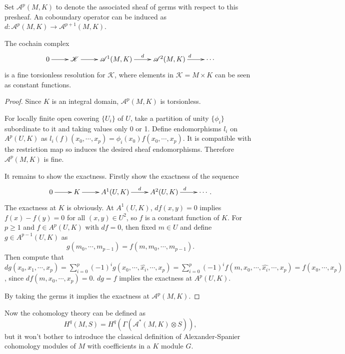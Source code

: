 \documentclass[twoside]{article}
\begin{document}
Set $\mathscr {A}^p(M,K)$ to denote the associated sheaf of germs with respect to this presheaf. An coboundary operator  can be induced as $d\colon \mathscr {A}^p(M,K)\to \mathscr {A}^{p+1}(M,K)$.

 \begin{lemma}\label{fine}

The  cochain complex
\begin{equation*}\xymatrix{
 0\ar[r]& \mathscr {K}\ar[r]& \mathscr {A}^1(M,K)\ar[r]^d &\mathscr {A}^2(M,K)\ar[r]^d&\cdots
 }
\end{equation*}
is a fine torsionless resolution for $\mathscr{K}$,
where  elements in $\mathscr {K}=M\times K$ can be seen as constant functions.
 \end{lemma}


 \begin{proof}
  Since $K$ is an integral domain, $\mathscr {A}^p(M,K)$ is torsionless.

  For locally finite open covering $\{U_i\}$ of $U$,  take a partition of unity $\{\phi_i\}$ subordinate to it and taking values only 0 or 1. Define  endomorphisms $l_i$ on $A^p(U,K)$ as $l_i(f)(x_0,\cdots,x_{p})=\phi_i(x_0)f(x_0,\cdots,x_{p})$. It is compatible with the restriction map so induces the desired sheaf endomorphisms. Therefore $\mathscr {A}^p(M,K)$ is fine.

  It remains to show the exactness. Firstly show the exactness of the sequence \begin{equation*}\xymatrix{
 0\ar[r]& K\ar[r]& A^1(U,K)\ar[r]^d &A^2(U,K)\ar[r]^d&\cdots.
 }
\end{equation*}
The exactness at $K$  is obviously. At $A^1(U,K)$, $df(x,y)=0$ implies $f(x)-f(y)=0$ for all $(x,y)\in U^2$, so $f$ is a constant function of $K$. For $p\geq 1$ and $f\in A^p(U,K)$ with $df=0$, then fixed $m\in U$ and define $g\in A^{p-1}(U,K)$ as $$
g(m_0,\cdots,m_{p-1})=f(m,m_0,\cdots,m_{p-1}).
$$
Then compute that $dg(x_0,x_1,\cdots,x_p)=\sum_{i=0}^p(-1)^ig(x_0,\cdots,\hat{x_i},\cdots,x_p)=\sum_{i=0}^p(-1)^if(m,x_0,\cdots,\hat{x_i},\cdots,x_p)
=f(x_0,\cdots,x_p)$, since $df(m,x_0,\cdots,x_p)=0$. $dg=f$ implies the exactness at $A^p(U,K)$.

By taking the germs it implies the exactness at  $\mathscr {A}^p(M,K)$.
\end{proof}

Now the cohomology theory can be defined as $$
H^q(M,S)=H^q(\Gamma(\mathscr {A}^*(M,K)\otimes S)),
$$
 but it won't bother to introduce the classical definition of Alexander-Spanier cohomology modules of $M$ with coefficients in a $K$ module $G$.
\end{document}

